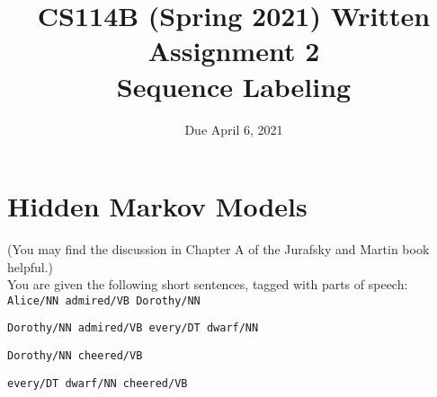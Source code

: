 \documentclass[11pt,letterpaper]{article}
\begin{document}
\title{CS114B (Spring 2021) Written Assignment 2\\Sequence Labeling}
\author{Due April 6, 2021}
\date{}
\maketitle

\section{Hidden Markov Models}

(You may find the discussion in Chapter A of the Jurafsky and Martin book helpful.)\\

\noindent You are given the following short sentences, tagged with parts of speech:\\

\texttt{Alice/NN admired/VB Dorothy/NN}

\texttt{Dorothy/NN admired/VB every/DT dwarf/NN}

\texttt{Dorothy/NN cheered/VB}

\texttt{every/DT dwarf/NN cheered/VB}
\end{document}
